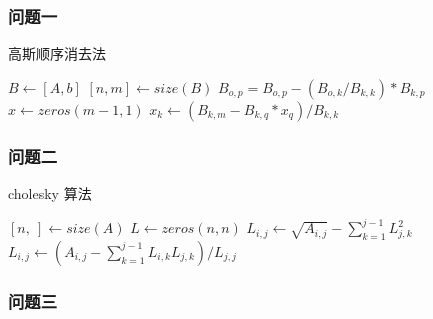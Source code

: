 \subsubsection{问题一}

\begin{breakablealgorithm}
    \caption{高斯顺序消去法}
    \begin{algorithmic}[1]
        \STATE $B \leftarrow [A, b]$ 
        \STATE $[n, m] \leftarrow size(B)$ 
        \STATE $B_{o, p} = B_{o, p} - (B_{o, k} / B_{k, k}) * B_{k, p}$
        \ENDFOR
        \ENDFOR
        \ENDFOR
        \STATE $x \leftarrow zeros(m-1, 1)$ 
        \STATE $x_k \leftarrow (B_{k, m} - B_{k, q} * x_q ) / B_{k, k}$
        \ENDFOR
        \ENDFOR
    \end{algorithmic}
\end{breakablealgorithm}

\subsubsection{问题二}

\begin{breakablealgorithm}
    \caption{cholesky 算法}
    \begin{algorithmic}[1]
        \STATE $[n, ~] \leftarrow size(A)$ 
        \STATE $L \leftarrow zeros(n, n)$ 
        \STATE $L_{i, j} \leftarrow \sqrt{A_{i, j}} - \sum_{k=1}^{j-1}L_{j, k}^2$
        \ELSE
        \STATE $L_{i, j} \leftarrow (A_{i, j} - \sum_{k=1}^{j-1}L_{i, k}L_{j, k}) / L_{j, j}$
        \ENDIF
        \ENDFOR
        \ENDFOR
    \end{algorithmic}
\end{breakablealgorithm}

\subsubsection{问题三}

